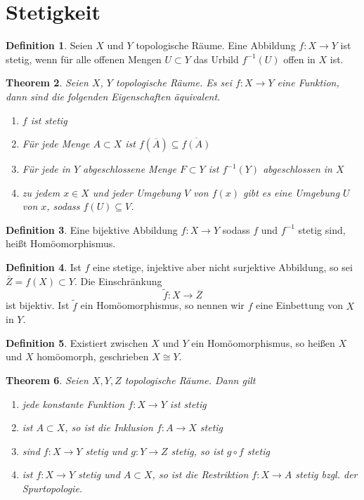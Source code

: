 \documentclass[a4paper, 12pt]{article}
\theoremstyle{plain}
\newtheorem{theorem}{Theorem}[section] %
\theoremstyle{definition}
\newtheorem{definition}[theorem]{Definition} %
\theoremstyle{lemma}
\theoremstyle{remark}
\theoremstyle{corollary}
\theoremstyle{example}
\begin{document}
	\section{Stetigkeit}
	\begin{definition}
		Seien $X$ und $Y$ topologische Räume. Eine Abbildung $f:X \to Y$ ist stetig, wenn für alle offenen Mengen $U \subset Y$ das Urbild $f^{-1}(U)$ offen in $X$ ist.
	\end{definition}
	\begin{theorem}
		Seien $X$, $Y$ topologische Räume. Es sei $f:X \to Y$ eine Funktion, dann sind die folgenden Eigenschaften äquivalent. \begin{enumerate}
			\item $f$ ist stetig
			\item Für jede Menge $A \subset X$ ist $f(\overline{A}) \subseteq \overline{f(A)}$
			\item Für jede in $Y$ abgeschlossene Menge $F \subset Y$ ist $f^{-1}(Y)$ abgeschlossen in $X$
			\item zu jedem $x \in X$ und jeder Umgebung $V$ von $f(x)$ gibt es eine Umgebung $U$ von $x$, sodass $f(U) \subseteq V$.
		\end{enumerate}
	\end{theorem}
	\begin{definition}
		Eine bijektive Abbildung $f:X\to Y$ sodass $f$ und $f^{-1}$ stetig sind, heißt Homöomorphismus.
	\end{definition}
	\begin{definition}
		Ist $f$ eine stetige, injektive aber nicht surjektive Abbildung, so sei $\overline{Z} = f(X) \subset Y$. Die Einschränkung \[\tilde{f}: X \to \overline{Z}\] ist bijektiv. Ist $\tilde{f}$ ein Homöomorphismus, so nennen wir $f$ eine Einbettung von $X$ in $Y$.
	\end{definition}
	\begin{definition}
		Existiert zwischen $X$ und $Y$ ein Homöomorphismus, so heißen $X$ und $X$ homöomorph, geschrieben $X \cong Y$.
	\end{definition}
	\begin{theorem}
		Seien $X,Y,Z$ topologische Räume. Dann gilt \begin{enumerate}
			\item jede konstante Funktion $f:X\to Y$ ist stetig
			\item ist $A\subset X$, so ist die Inklusion $f: A \to X$ stetig
			\item sind $f:X\to Y$ stetig und $g:Y \to Z$ stetig, so ist $g\circ f$ stetig
			\item ist $f:X\to Y$ stetig und $A\subset X$, so ist die Restriktion $f:X \to A$ stetig bzgl. der Spurtopologie.
		\end{enumerate}
	\end{theorem}
\end{document}
